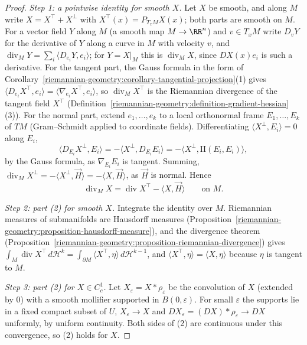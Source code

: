 \begin{proof}
\emph{Step 1: a pointwise identity for smooth $X$.} Let $X$ be smooth, and along $M$ write $X = X^\top + X^\perp$ with $X^\top(x) = P_{T_xM}X(x)$; both parts are smooth on $M$. For a vector field $Y$ along $M$
(a smooth map $M \to \RR^n$) and $v \in T_xM$ write $D_vY$ for the derivative of $Y$ along a curve in $M$ with velocity $v$, and $\operatorname{div}_MY = \sum_i\langle D_{e_i}Y, e_i\rangle$; for $Y = X|_M$ this is
$\operatorname{div}_MX$, since $DX(x)e_i$ is such a derivative. For the tangent part, the Gauss formula in the form of Corollary~\ref{riemannian-geometry:corollary-tangential-projection}(1) gives
$\langle D_{e_i}X^\top, e_i\rangle = \langle\nabla_{e_i}X^\top, e_i\rangle$, so $\operatorname{div}_MX^\top$ is the Riemannian divergence of the tangent field $X^\top$
(Definition~\ref{riemannian-geometry:definition-gradient-hessian}(3)). For the normal part, extend $e_1, \ldots, e_k$ to a local orthonormal frame $E_1, \ldots, E_k$ of $TM$ (Gram--Schmidt applied to coordinate
fields). Differentiating $\langle X^\perp, E_i\rangle = 0$ along $E_i$,
\[
\langle D_{E_i}X^\perp, E_i\rangle = -\langle X^\perp, D_{E_i}E_i\rangle = -\langle X^\perp, \mathrm{II}(E_i, E_i)\rangle,
\]
by the Gauss formula, as $\nabla_{E_i}E_i$ is tangent. Summing, $\operatorname{div}_MX^\perp = -\langle X^\perp, \vec{H}\rangle = -\langle X, \vec{H}\rangle$, as $\vec{H}$ is normal. Hence
\[
\operatorname{div}_MX = \operatorname{div}X^\top - \langle X, \vec{H}\rangle \qquad\text{on } M .
\]

\emph{Step 2: part (2) for smooth $X$.} Integrate the identity over $M$. Riemannian measures of submanifolds are Hausdorff measures (Proposition~\ref{riemannian-geometry:proposition-hausdorff-measure}), and the
divergence theorem (Proposition~\ref{riemannian-geometry:proposition-riemannian-divergence}) gives $\int_M\operatorname{div}X^\top\,d\mathcal{H}^k = \int_{\partial M}\langle X^\top, \eta\rangle\,d\mathcal{H}^{k-1}$,
and $\langle X^\top, \eta\rangle = \langle X, \eta\rangle$ because $\eta$ is tangent to $M$.

\emph{Step 3: part (2) for $X \in C^1_c$.} Let $X_\varepsilon = X * \rho_\varepsilon$ be the convolution of $X$ (extended by $0$) with a smooth mollifier supported in $B(0, \varepsilon)$. For small $\varepsilon$ the
supports lie in a fixed compact subset of $U$, $X_\varepsilon \to X$ and $DX_\varepsilon = (DX) * \rho_\varepsilon \to DX$ uniformly, by uniform continuity. Both sides of (2) are continuous under this
convergence, so (2) holds for $X$.


\end{proof}
